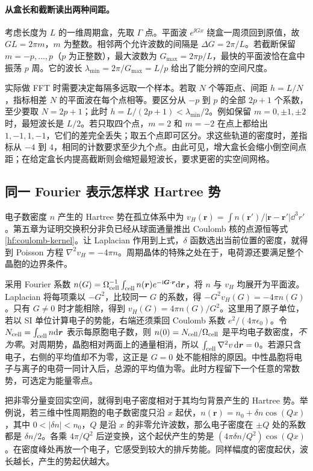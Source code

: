 \paragraph{从盒长和截断读出两种间距。}
考虑长度为 $L$ 的一维周期盒，先取 $\Gamma$ 点。平面波 $e^{\ii Gx}$ 绕盒一周须回到原值，故 $GL=2\pi m$，$m$ 为整数。相邻两个允许波数的间隔是 $\Delta G=2\pi/L$。若截断保留 $m=-p,\ldots,p$（$p$ 为正整数），最大波数为 $G_{\max}=2\pi p/L$，最快的平面波恰在盒中振荡 $p$ 周。它的波长 $\lambda_{\min}=2\pi/G_{\max}=L/p$ 给出了能分辨的空间尺度。

实际做 FFT 时需要决定每隔多远取一个样本。若取 $N$ 个等距点、间距 $h=L/N$，指标相差 $N$ 的平面波在每个点相等。要区分从 $-p$ 到 $p$ 的全部 $2p+1$ 个系数，至少要取 $N=2p+1$；此时 $h=L/(2p+1)<\lambda_{\min}/2$。例如保留 $m=0,\pm1,\pm2$ 时，最短波长是 $L/2$。若只取四个点，$m=2$ 和 $m=-2$ 在点上都给出 $1,-1,1,-1$，它们的差完全丢失；取五个点即可区分。求这些轨道的密度时，差指标从 $-4$ 到 $4$，相同的计数要求至少九个点。由此可见，增大盒长会缩小倒空间点距；在给定盒长内提高截断则会缩短最短波长，要求更密的实空间网格。

\subsection{同一 Fourier 表示怎样求 Hartree 势}

电子数密度 $n$ 产生的 Hartree 势在孤立体系中为 $v_H(\bm r)=\int n(\bm r')/|\bm r-\bm r'|\dd^3r'$。第五章为证明交换积分非负已经从球面通量推出 Coulomb 核的点源恒等式\eqref{hf:coulomb-kernel}。让 Laplacian 作用到上式，$\delta$ 函数选出当前位置的密度，就得到 Poisson 方程 $\nabla^2v_H=-4\pi n$。周期晶体的特殊之处在于，电荷源还要满足整个晶胞的边界条件。

采用 Fourier 系数 $n(G)=\Omega_{\rm cell}^{-1}\int_{\rm cell}n(\bm r)e^{-\mathrm{i}\bm G\cdot\bm r}\mathrm{d}\bm r$，将 $n$ 与 $v_H$ 均展开为平面波。Laplacian 将每项乘以 $-G^2$，比较同一 $G$ 的系数，得 $-G^2v_H(G)=-4\pi n(G)$。只有 $G\ne0$ 时才能相除，得到 $v_H(G)=4\pi n(G)/G^2$。这里用了原子单位，若以 SI 单位计算电子的势能，右端还须乘回 Coulomb 系数 $e^2/(4\pi\epsilon_0)$。令 $N_{\rm cell}=\int_{\rm cell}n\mathrm{d}\bm r$ 表示每原胞电子数，则 $n(0)=N_{\rm cell}/\Omega_{\rm cell}$ 是平均电子数密度，\emph{不为零}。对周期势，晶胞相对两面上的通量相消，所以 $\int_{\rm cell}\nabla^2v\,\mathrm{d}\bm r=0$。若源只含电子，右侧的平均值却不为零，这正是 $G=0$ 处不能相除的原因。中性晶胞将电子与离子的电荷一同计入后，总源的平均值为零。此时方程留下一个任意的常数势，可选定为能量零点。

\begin{samepage}
把非零分量变回实空间，就得到电子密度相对于其均匀背景产生的 Hartree 势。举例说，若三维中性周期胞的电子数密度只沿 $x$ 起伏，$n(\bm r)=n_0+\delta n\cos(Qx)$，其中 $0<|\delta n|<n_0$，$Q$ 是沿 $x$ 的非零允许波数，那么电子密度在 $\pm Q$ 处的系数都是 $\delta n/2$。各乘 $4\pi/Q^2$ 后逆变换，这个起伏产生的势是 $(4\pi\delta n/Q^2)\cos(Qx)$。在密度峰处再放一个电子，它感受到较大的排斥势能。同样幅度的密度起伏，波长越长，产生的势起伏越大。\par
\end{samepage}

